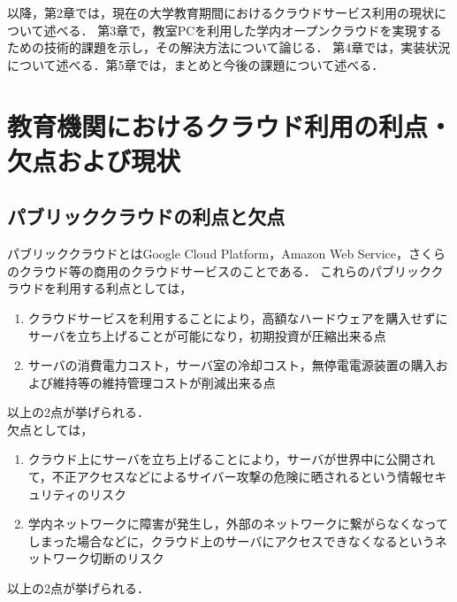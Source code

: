 \documentclass[11pt,a4]{jsarticle}
\begin{document}
\par 以降，第2章では，現在の大学教育期間におけるクラウドサービス利用の現状について述べる．
第3章で，教室PCを利用した学内オープンクラウドを実現するための技術的課題を示し，その解決方法について論じる．
第4章では，実装状況について述べる．第5章では，まとめと今後の課題について述べる．

\section{教育機関におけるクラウド利用の利点・欠点および現状}
\subsection{パブリッククラウドの利点と欠点}
パブリッククラウドとはGoogle Cloud Platform，Amazon Web Service，さくらのクラウド等の商用のクラウドサービスのことである．
これらのパブリッククラウドを利用する利点としては，
\begin{enumerate}
	\item クラウドサービスを利用することにより，高額なハードウェアを購入せずにサーバを立ち上げることが可能になり，初期投資が圧縮出来る点
	\item サーバの消費電力コスト，サーバ室の冷却コスト，無停電電源装置の購入および維持等の維持管理コストが削減出来る点
\end{enumerate}
以上の2点が挙げられる．
\\ 欠点としては，
\begin{enumerate}
	\item クラウド上にサーバを立ち上げることにより，サーバが世界中に公開されて，不正アクセスなどによるサイバー攻撃の危険に晒されるという情報セキュリティのリスク
	\item 学内ネットワークに障害が発生し，外部のネットワークに繋がらなくなってしまった場合などに，クラウド上のサーバにアクセスできなくなるというネットワーク切断のリスク
\end{enumerate}
以上の2点が挙げられる．
\end{document}
